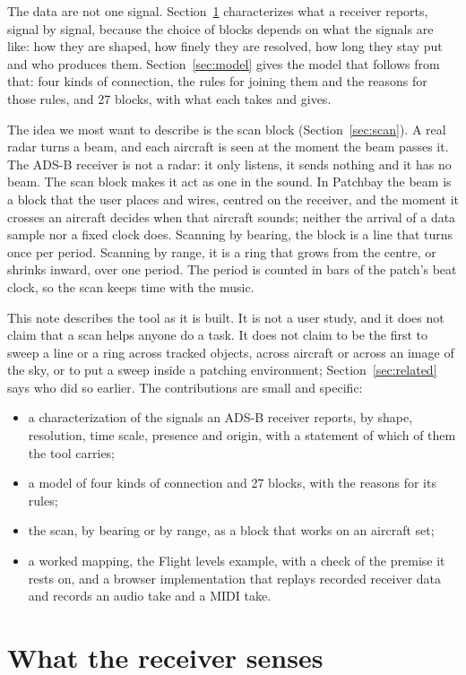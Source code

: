 \documentclass[11pt,letterpaper]{article}
\begin{document}
The data are not one signal. Section~\ref{sec:signals} characterizes what a receiver reports, signal by signal, because the choice of blocks depends on what the signals are like: how they are shaped, how finely they are resolved, how long they stay put and who produces them. Section~\ref{sec:model} gives the model that follows from that: four kinds of connection, the rules for joining them and the reasons for those rules, and 27 blocks, with what each takes and gives.

The idea we most want to describe is the scan block (Section~\ref{sec:scan}). A real radar turns a beam, and each aircraft is seen at the moment the beam passes it. The ADS-B receiver is not a radar: it only listens, it sends nothing and it has no beam. The scan block makes it act as one in the sound. In Patchbay the beam is a block that the user places and wires, centred on the receiver, and the moment it crosses an aircraft decides when that aircraft sounds; neither the arrival of a data sample nor a fixed clock does. Scanning by bearing, the block is a line that turns once per period. Scanning by range, it is a ring that grows from the centre, or shrinks inward, over one period. The period is counted in bars of the patch's beat clock, so the scan keeps time with the music.

This note describes the tool as it is built. It is not a user study, and it does not claim that a scan helps anyone do a task. It does not claim to be the first to sweep a line or a ring across tracked objects, across aircraft or across an image of the sky, or to put a sweep inside a patching environment; Section~\ref{sec:related} says who did so earlier. The contributions are small and specific:
\begin{itemize}
\item a characterization of the signals an ADS-B receiver reports, by shape, resolution, time scale, presence and origin, with a statement of which of them the tool carries;
\item a model of four kinds of connection and 27 blocks, with the reasons for its rules;
\item the scan, by bearing or by range, as a block that works on an aircraft set;
\item a worked mapping, the Flight levels example, with a check of the premise it rests on, and a browser implementation that replays recorded receiver data and records an audio take and a MIDI take.
\end{itemize}

\section{What the receiver senses}\label{sec:signals}
\end{document}
